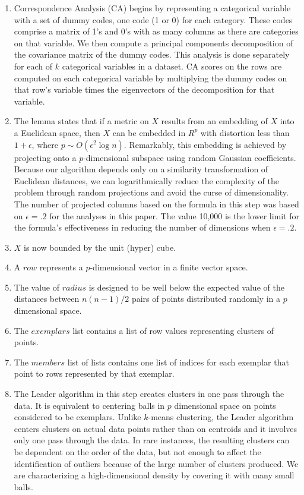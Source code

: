 \documentclass[12pt]{article}
\begin{document}
\begin{enumerate}
\item Correspondence Analysis (CA) begins by representing a categorical variable with a set of dummy codes, one code (1 or 0) for each category. These codes comprise a matrix of 1's and 0's with as many columns as there are categories on that variable. We then compute a principal components decomposition of the covariance matrix of the dummy codes. This analysis is done separately for each of $k$ categorical variables in a dataset. CA scores on the rows are computed on each categorical variable by multiplying the dummy codes on that row's variable times the eigenvectors of the decomposition for that variable. \footnotemark
\item The \cite{JohnsonLindenstrauss} lemma states that if a metric on $X$ results from an embedding of $X$ into a Euclidean space, then $X$ can be embedded  in $R^p$ with distortion less than $1 + \epsilon$, where $p \sim O(\epsilon^2 \log n)$. Remarkably, this embedding is achieved by projecting onto a $p$-dimensional subspace using random Gaussian coefficients. Because our algorithm depends only on a similarity transformation of Euclidean distances, we can logarithmically reduce the complexity of the problem through random projections and avoid the curse of dimensionality. The number of projected columns based on the formula in this step was based on $\epsilon = .2$ for the analyses in this paper. The value 10,000 is the lower limit for the formula's effectiveness in reducing the number of dimensions when $\epsilon = .2$.
\item $X$ is now bounded by the unit (hyper) cube.
\item A $row$ represents a $p$-dimensional vector in a finite vector space.
\item The value of $radius$ is designed to be well below the expected value of the distances between $n(n-1)/2$ pairs of points distributed randomly in a $p$ dimensional space.
\item The $exemplars$ list contains a list of row values representing clusters of points.
\item The $members$ list of lists contains one list of indices for each exemplar that point to rows represented by that exemplar.
\item The Leader algorithm \citep{ClusteringAlgorithms} in this step creates clusters in one pass through the data. It is equivalent to centering balls in $p$ dimensional space on points considered to be exemplars. Unlike $k$-means clustering, the Leader algorithm centers clusters on actual data points rather than on centroids and it involves only one pass through the data. In rare instances, the resulting clusters can be dependent on the order of the data, but not enough to affect the identification of outliers because of the large number of clusters produced. We are characterizing a high-dimensional density by covering it with many small balls. 

\end{enumerate}
\end{document}
